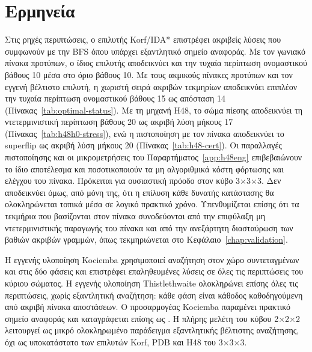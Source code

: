 \begin{table}[htbp]\centering

\caption[Αντιπροσωπευτικές λύσεις του κύβου 2×2×2]{Αντιπροσωπευτικές ακριβείς λύσεις του κύβου 2×2×2 με μήκος, ακολουθία λύσης και κατάσταση αποτελέσματος. Πηγή: .}
\label{tab:pocket-representatives}
\end{table}

\section{Ερμηνεία}
\label{sec:experiments-interpretation}

Στις ρηχές περιπτώσεις, ο επιλυτής Korf/IDA* επιστρέφει ακριβείς λύσεις που συμφωνούν με την BFS όπου υπάρχει εξαντλητικό σημείο αναφοράς. Με τον γωνιακό πίνακα προτύπων, ο ίδιος επιλυτής αποδεικνύει και την τυχαία περίπτωση ονομαστικού βάθους 10 μέσα στο όριο βάθους 10. Με τους ακμικούς πίνακες προτύπων και τον εγγενή βέλτιστο επιλυτή, η χωριστή σειρά ακριβών τεκμηρίων αποδεικνύει επιπλέον την τυχαία περίπτωση ονομαστικού βάθους 15 ως απόσταση 14 (Πίνακας~\ref{tab:optimal-status}). Με τη μηχανή H48, το σώμα πίεσης αποδεικνύει τη ντετερμινιστική περίπτωση βάθους 20 ως ακριβή λύση μήκους 17 (Πίνακας~\ref{tab:h48h0-stress}), ενώ η πιστοποίηση με τον πίνακα  αποδεικνύει το superflip ως ακριβή λύση μήκους 20 (Πίνακας~\ref{tab:h48-cert}). Οι παραλλαγές πιστοποίησης και οι μικρομετρήσεις του Παραρτήματος~\ref{app:h48eng} επιβεβαιώνουν το ίδιο αποτέλεσμα και ποσοτικοποιούν τα μη αλγοριθμικά κόστη φόρτωσης και ελέγχου του πίνακα. Πρόκειται για ουσιαστική πρόοδο στον κύβο 3×3×3. Δεν αποδεικνύει όμως, από μόνη της, ότι η επίλυση κάθε δυνατής κατάστασης θα ολοκληρώνεται τοπικά μέσα σε λογικό πρακτικό χρόνο. Υπενθυμίζεται επίσης ότι τα τεκμήρια που βασίζονται στον πίνακα  συνοδεύονται από την επιφύλαξη μη ντετερμινιστικής παραγωγής του πίνακα και από την ανεξάρτητη διασταύρωση των βαθιών ακριβών γραμμών, όπως τεκμηριώνεται στο Κεφάλαιο~\ref{chap:validation}.

Η εγγενής υλοποίηση Kociemba χρησιμοποιεί αναζήτηση στον χώρο συντεταγμένων και στις δύο φάσεις και επιστρέφει επαληθευμένες λύσεις σε όλες τις περιπτώσεις του κύριου σώματος. Η εγγενής υλοποίηση Thistlethwaite ολοκληρώνει επίσης όλες τις περιπτώσεις, χωρίς εξαντλητική αναζήτηση: κάθε φάση είναι κάθοδος καθοδηγούμενη από ακριβή πίνακα αποστάσεων. Ο προσαρμογέας Kociemba παραμένει πρακτικό σημείο αναφοράς και καταγράφεται επίσης ως . Η πλήρης μελέτη του κύβου 2×2×2 λειτουργεί ως μικρό ολοκληρωμένο παράδειγμα εξαντλητικής βέλτιστης αναζήτησης, όχι ως υποκατάστατο των επιλυτών Korf, PDB και H48 του 3×3×3.


